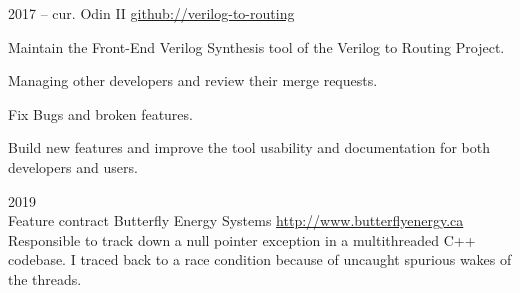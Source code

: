 \documentclass{developercv} %
\begin{document}
\entrys
{2017 -- cur.}
{Odin II}
{\href{https://github.com/verilog-to-routing/vtr-verilog-to-routing/graphs/contributors}{github://verilog-to-routing}}{
	Maintain the Front-End Verilog Synthesis tool of the Verilog to Routing Project.
	\begin{tightemize}
		\item Managing other developers and review their merge requests.
		\item Fix Bugs and broken features.
		\item Build new features and improve the tool usability and documentation for both developers and users.
	\end{tightemize}
}

\entrys
{2019 \\{\footnotesize Feature contract}}
{Butterfly Energy Systems}
{\href{http://www.butterflyenergy.ca/home.php}{http://www.butterflyenergy.ca}}{
Responsible to track down a null pointer exception in a multithreaded C++ codebase.
I traced back to a race condition because of uncaught spurious wakes of the threads.
}



\vspace*{\baselineskip}


\vspace*{\baselineskip}


\vspace*{\baselineskip}


\vspace*{\baselineskip}

\vspace*{\baselineskip}
\end{document}
